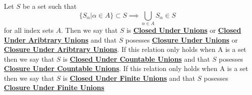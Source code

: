 \newcommand{\ClosureUnderFiniteUnions}[0]{\textbf{\hyperref[def:ClosureUnderUnion]{Closure Under Finite Unions}}\xspace}
\newcommand{\ClosureUnderCountableUnions}[0]{\textbf{\hyperref[def:ClosureUnderUnion]{Closure Under Countable Unions}}\xspace}
\newcommand{\ClosureUnderUnions}[0]{\textbf{\hyperref[def:ClosureUnderUnion]{Closure Under Unions}}\xspace}
\newcommand{\ClosureUnderArbitraryUnions}[0]{\textbf{\hyperref[def:ClosureUnderUnion]{Closure Under Aribtrary Unions}}\xspace}
\newcommand{\ClosedUnderFiniteUnions}[0]{\textbf{\hyperref[def:ClosureUnderUnion]{Closed Under Finite Unions}}\xspace}
\newcommand{\ClosedUnderCountableUnions}[0]{\textbf{\hyperref[def:ClosureUnderUnion]{Closed Under Countable Unions}}\xspace}
\newcommand{\ClosedUnderUnions}[0]{\textbf{\hyperref[def:ClosureUnderUnion]{Closed Under Unions}}\xspace}
\newcommand{\ClosedUnderArbitraryUnions}[0]{\textbf{\hyperref[def:ClosureUnderUnion]{Closed Under Aribtrary Unions}}\xspace}
\begin{df}
\label{def:ClosureUnderUnion}

\rm
    Let $S$ be a set such that 
    \begin{equation*}
    \{ S_\alpha | \alpha \in A\} \subset S \implies \bigcup_{\alpha \in A} S_{\alpha}   \in S
    \end{equation*}
    for all index sets $A$. 
    Then we say that $S$ is 
    \ClosedUnderUnions
    or
    \ClosedUnderArbitraryUnions
    and that $S$ posesses 
    \ClosureUnderUnions
    or
    \ClosureUnderArbitraryUnions.
    If this relation only holds when A is a 
    \Countable set then we say that 
    $S$ is 
    \ClosedUnderCountableUnions
    and that $S$ posesses
    \ClosureUnderCountableUnions. 
    If this relation only holds when A is a 
    \Finite set then we say that 
    $S$ is 
    \ClosedUnderFiniteUnions
    and that $S$ posesses
    \ClosureUnderFiniteUnions    
\end{df}
